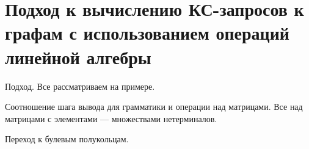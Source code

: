\chapter{Подход к вычислению КС-запросов к графам с использованием операций линейной алгебры}\label{ch:ch2}

Подход. Все рассматриваем на примере.

Соотношение шага вывода для грамматики и операции над матрицами. Все над матрицами с элементами --- множествами нетерминалов.

Переход к булевым полукольцам.

\FloatBarrier
